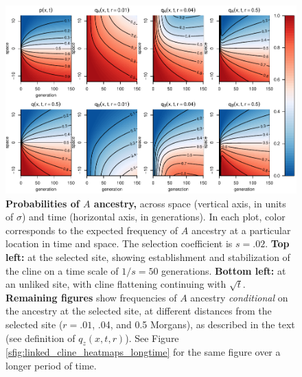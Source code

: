 \documentclass[11pt,letterpaper]{article}
\begin{document}


\begin{figure}
    \includegraphics{figs/linked-frequencies.pdf}
    \caption{
        \textbf{Probabilities of $A$ ancestry,}
        across space (vertical axis, in units of $\sigma$) 
        and time (horizontal axis, in generations).
        In each plot, color corresponds to the expected frequency of $A$ ancestry
        at a particular location in time and space.
        The selection coefficient is $s=.02$.
        \textbf{Top left:} at the selected site, showing establishment and stabilization of the cline
        on a time scale of $1/s=50$ generations.
        \textbf{Bottom left:} at an unliked site,
        with cline flattening continuing with $\sqrt{t}$.
        \textbf{Remaining figures} show frequencies of $A$ ancestry \emph{conditional}
        on the ancestry at the selected site,
        at different distances from the selected site ($r=.01$, .04, and 0.5 Morgans),
        as described in the text (see definition of $q_z(x,t,r)$).
        See Figure \ref{sfig:linked_cline_heatmaps_longtime}
        for the same figure over a longer period of time.
    }
    \label{fig:linked_cline_heatmaps}
\end{figure}
\end{document}
